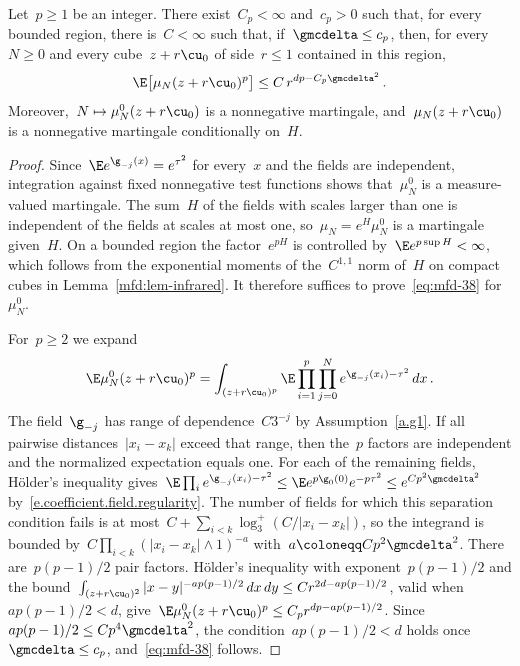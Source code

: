 \documentclass[11pt]{amsart}
\begin{document}
\begin{lemma}
\label{mfd:lem-chaos-moments}
Let~$p\geq1$ be an integer. There exist~$C_p<\infty$ and~$c_p>0$ such that, for every bounded region, there is~$C<\infty$ such that, if~$\gmcdelta\leq c_p$, then, for every~$N\geq0$ and every cube~$z+r\cu_0$ of side~$r\leq1$ contained in this region,
\begin{equation}
	\E\bigl[\mu_N(z+r\cu_0)^p\bigr]\leq C\,r^{dp-C_p\gmcdelta^2}\,.
	\label{eq:mfd-38}
\end{equation}
Moreover,~$N\mapsto \mu_N^0(z+r\cu_0)$ is a nonnegative martingale, and~$\mu_N(z+r\cu_0)$ is a nonnegative martingale conditionally on~$H$.
\end{lemma}
\begin{proof}
Since~$\E e^{\g_{-j}(x)}=e^{\tau^2}$ for every~$x$ and the fields are independent, integration against fixed nonnegative test functions shows that~$\mu_N^0$ is a measure-valued martingale. The sum~$H$ of the fields with scales larger than one is independent of the fields at scales at most one, so~$\mu_N=e^H\mu_N^0$ is a martingale given~$H$. On a bounded region the factor~$e^{pH}$ is controlled by~$\E e^{p\sup H}<\infty$, which follows from the exponential moments of the~$C^{1,1}$ norm of~$H$ on compact cubes in Lemma~\ref{mfd:lem-infrared}. It therefore suffices to prove~\eqref{eq:mfd-38} for~$\mu_N^0$.

\smallskip

For~$p\geq2$ we expand
\begin{equation*}
	\E \mu_N^0(z+r\cu_0)^p=\int_{(z+r\cu_0)^p}\E\prod_{i=1}^p\prod_{j=0}^N
	e^{\g_{-j}(x_i)-\tau^2}\,dx\,.
\end{equation*}
The field~$\g_{-j}$ has range of dependence~$C3^{-j}$ by Assumption~\ref{a.g1}. If all pairwise distances~$|x_i-x_k|$ exceed that range, then the~$p$ factors are independent and the normalized expectation equals one. For each of the remaining fields, H\"older's inequality gives~$\E\prod_ie^{\g_{-j}(x_i)-\tau^2}\leq\E e^{p\g_0(0)}e^{-p\tau^2}\leq e^{Cp^2\gmcdelta^2}$ by~\eqref{e.coefficient.field.regularity}. The number of fields for which this separation condition fails is at most~$C+\sum_{i<k}\log_3^+(C/|x_i-x_k|)$, so the integrand is bounded by~$C\prod_{i<k}(|x_i-x_k|\wedge1)^{-a}$ with~$a\coloneqq Cp^2\gmcdelta^2$. There are~$p(p-1)/2$ pair factors. H\"older's inequality with exponent~$p(p-1)/2$ and the bound~$\int_{(z+r\cu_0)^2}|x-y|^{-ap(p-1)/2}\,dx\,dy\leq Cr^{2d-ap(p-1)/2}$, valid when~$ap(p-1)/2<d$, give~$\E \mu_N^0(z+r\cu_0)^p\leq C_pr^{dp-ap(p-1)/2}$. Since~$ap(p-1)/2\leq Cp^4\gmcdelta^2$, the condition~$ap(p-1)/2<d$ holds once~$\gmcdelta\leq c_p$, and~\eqref{eq:mfd-38} follows.
\end{proof}
\end{document}

